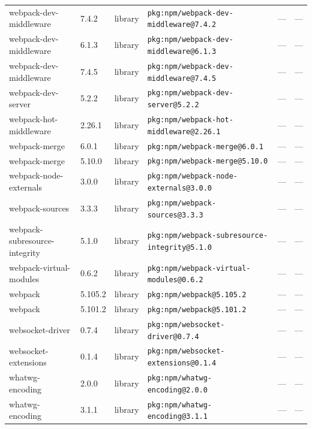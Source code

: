 \documentclass[11pt,a4paper]{article}
\begin{document}
\begin{longtable}{|p{4cm}|p{2cm}|p{1.6cm}|p{5cm}|p{1.5cm}|p{3.5cm}|}
\raggedright webpack-dev-middleware & 7.4.2 & library & \small\texttt{pkg:npm/webpack-dev-middleware@7.4.2} & — & \small — \\
\raggedright webpack-dev-middleware & 6.1.3 & library & \small\texttt{pkg:npm/webpack-dev-middleware@6.1.3} & — & \small — \\
\raggedright webpack-dev-middleware & 7.4.5 & library & \small\texttt{pkg:npm/webpack-dev-middleware@7.4.5} & — & \small — \\
\raggedright webpack-dev-server & 5.2.2 & library & \small\texttt{pkg:npm/webpack-dev-server@5.2.2} & — & \small — \\
\raggedright webpack-hot-middleware & 2.26.1 & library & \small\texttt{pkg:npm/webpack-hot-middleware@2.26.1} & — & \small — \\
\raggedright webpack-merge & 6.0.1 & library & \small\texttt{pkg:npm/webpack-merge@6.0.1} & — & \small — \\
\raggedright webpack-merge & 5.10.0 & library & \small\texttt{pkg:npm/webpack-merge@5.10.0} & — & \small — \\
\raggedright webpack-node-externals & 3.0.0 & library & \small\texttt{pkg:npm/webpack-node-externals@3.0.0} & — & \small — \\
\raggedright webpack-sources & 3.3.3 & library & \small\texttt{pkg:npm/webpack-sources@3.3.3} & — & \small — \\
\raggedright webpack-subresource-integrity & 5.1.0 & library & \small\texttt{pkg:npm/webpack-subresource-integrity@5.1.0} & — & \small — \\
\raggedright webpack-virtual-modules & 0.6.2 & library & \small\texttt{pkg:npm/webpack-virtual-modules@0.6.2} & — & \small — \\
\raggedright webpack & 5.105.2 & library & \small\texttt{pkg:npm/webpack@5.105.2} & — & \small — \\
\raggedright webpack & 5.101.2 & library & \small\texttt{pkg:npm/webpack@5.101.2} & — & \small — \\
\raggedright websocket-driver & 0.7.4 & library & \small\texttt{pkg:npm/websocket-driver@0.7.4} & — & \small — \\
\raggedright websocket-extensions & 0.1.4 & library & \small\texttt{pkg:npm/websocket-extensions@0.1.4} & — & \small — \\
\raggedright whatwg-encoding & 2.0.0 & library & \small\texttt{pkg:npm/whatwg-encoding@2.0.0} & — & \small — \\
\raggedright whatwg-encoding & 3.1.1 & library & \small\texttt{pkg:npm/whatwg-encoding@3.1.1} & — & \small — \\

\end{longtable}
\end{document}
